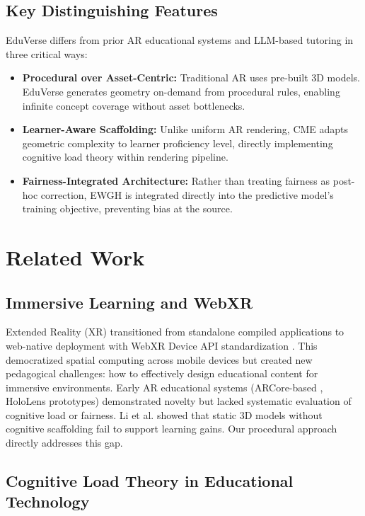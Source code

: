 \documentclass[conference]{IEEEtran}
\begin{document}
\subsection{Key Distinguishing Features}

EduVerse differs from prior AR educational systems and LLM-based tutoring in three critical ways:

\begin{itemize}
    \item \textbf{Procedural over Asset-Centric:} Traditional AR uses pre-built 3D models. EduVerse generates geometry on-demand from procedural rules, enabling infinite concept coverage without asset bottlenecks.
    
    \item \textbf{Learner-Aware Scaffolding:} Unlike uniform AR rendering, CME adapts geometric complexity to learner proficiency level, directly implementing cognitive load theory within rendering pipeline.
    
    \item \textbf{Fairness-Integrated Architecture:} Rather than treating fairness as post-hoc correction, EWGH is integrated directly into the predictive model's training objective, preventing bias at the source.
\end{itemize}

\section{Related Work}

\subsection{Immersive Learning and WebXR}

Extended Reality (XR) transitioned from standalone compiled applications to web-native deployment with WebXR Device API standardization \cite{peters2023webxr, robinson2025webxr}. This democratized spatial computing across mobile devices but created new pedagogical challenges: how to effectively design educational content for immersive environments. Early AR educational systems (ARCore-based \cite{brown2023ar}, HoloLens prototypes) demonstrated novelty but lacked systematic evaluation of cognitive load or fairness. Li et al. \cite{li2021scaffolding} showed that static 3D models without cognitive scaffolding fail to support learning gains. Our procedural approach directly addresses this gap.

\subsection{Cognitive Load Theory in Educational Technology}
\end{document}
